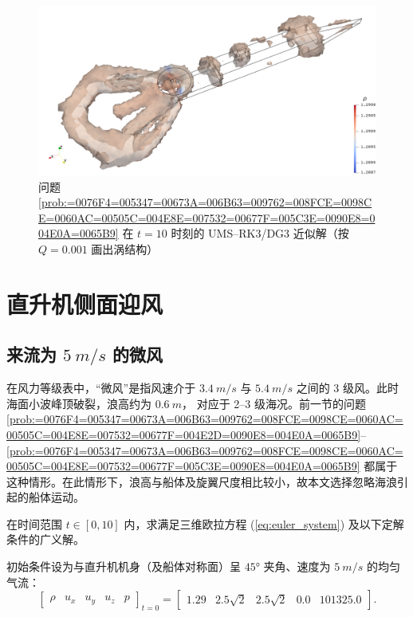 \begin{figure}[h!]
\begin{centering}
\includegraphics[width=1\textwidth,height=0.28\textheight,keepaspectratio]{figures/ship/x=0/Frame100_Q}
\par\end{centering}
\caption{\label{fig:ship_x=00003D0_a=00003D0_t=00003D10_Q}问题 \ref{prob:=0076F4=005347=00673A=006B63=009762=008FCE=0098CE=0060AC=00505C=004E8E=007532=00677F=005C3E=0090E8=004E0A=0065B9}
在 $t=10$ 时刻的 UMS–RK3/DG3 近似解（按 $Q=0.001$ 画出涡结构）}
\end{figure}


\section{直升机侧面迎风}

\subsection{来流为 $\SI{5}{m/s}$ 的微风}

在风力等级表中，“微风”是指风速介于 $\SI{3.4}{m/s}$ 与 $\SI{5.4}{m/s}$ 之间的 3 级风。此时海面小波峰顶破裂，浪高约为
$\SI{0.6}{m}$， 对应于 2–3 级海况。前一节的问题 \ref{prob:=0076F4=005347=00673A=006B63=009762=008FCE=0098CE=0060AC=00505C=004E8E=007532=00677F=004E2D=0090E8=004E0A=0065B9}–\ref{prob:=0076F4=005347=00673A=006B63=009762=008FCE=0098CE=0060AC=00505C=004E8E=007532=00677F=005C3E=0090E8=004E0A=0065B9}
都属于这种情形。在此情形下，浪高与船体及旋翼尺度相比较小，故本文选择忽略海浪引起的船体运动。
\begin{problem}
[直升机侧面迎微风悬停于甲板中部上方]\label{prob:=0076F4=005347=00673A=004FA7=009762=008FCE=005FAE=0098CE=0060AC=00505C=004E8E=007532=00677F=004E2D=0090E8=004E0A=0065B9}在时间范围
$t\in[0,10]$ 内，求满足三维欧拉方程 (\ref{eq:euler_system}) 及以下定解条件的广义解。

初始条件设为与直升机机身（及船体对称面）呈 $\ang{45}$ 夹角、速度为 $\SI{5}{m/s}$ 的均匀气流：
\begin{equation}
\begin{bmatrix}\rho & u_{x} & u_{y} & u_{z} & p\end{bmatrix}_{t=0}=\begin{bmatrix}1.29 & 2.5\sqrt{2} & 2.5\sqrt{2} & 0.0 & 101325.0\end{bmatrix}.
\end{equation}
\end{problem}

